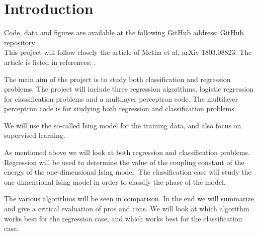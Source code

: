 \section{Introduction}
Code, data and figures are available at the following GitHub address:
\href{https://github.com/geirtul/fys-stk4155/tree/master/project2}{GitHub repository}\\
This project will follow closely the article of Metha et al, arXiv 1803.08823. 
The article is listed in references: \cite{HighBias}.

The main aim of the project is to study both classification and regression 
problems. The project will include three regression algorithms, 
logistic regression for classification problems and a multilayer 
perceptron code. The multilayer perceptron code is for studying both regression
and classification problems.

We will use the so-called Ising model for the training data, and also 
focus on supervised learning. 

As mentioned above we will look at both regression and classification problems.
Regression will be used to determine the value of the coupling constant
of the energy of the one-dimensional Ising model. 
The classification case will study the one dimensional Ising model in order to
classify the phase of the model. 

The various algorithms will be seen in comparison. In the end we will
summarize and give a critical evaluation of pros and cons. 
We will look at which algorithm works best for the regression case, 
and which works best for the classification case.~\cite{Project2} 
